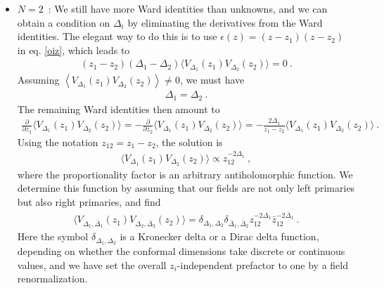 \documentclass[12pt, a4paper, notitlepage, twoside]{report}
\numberwithin{equation}{section}
\theoremstyle{break}
\begin{document}
\begin{itemize}
\item $\boxed{N=2}$\ : We still have more Ward identities than unknowns, and we can obtain a condition on $\Delta_i$ by eliminating the derivatives from the Ward identities.
The elegant way to do this is to use $\epsilon(z)=(z-z_1)(z-z_2)$ in eq. \eqref{oiz}, which leads to 
\begin{align}
 (z_1-z_2)(\Delta_1-\Delta_2)\Big\langle V_{\Delta_1}(z_1)V_{\Delta_2}(z_2)\Big\rangle =0\ .
\end{align}
Assuming $\left\langle V_{\Delta_1}(z_1)V_{\Delta_2}(z_2)\right\rangle\neq 0$, we must have 
\begin{align}
 \Delta_1 = \Delta_2 \ . 
\label{ded}
\end{align}
The remaining Ward identities then amount to 
\begin{align}
 \frac{\partial}{\partial z_1}\Big\langle V_{\Delta_1}(z_1)V_{\Delta_2}(z_2)\Big\rangle = - \frac{\partial}{\partial z_2}\Big\langle V_{\Delta_1}(z_1)V_{\Delta_2}(z_2)\Big\rangle = -\frac{2\Delta_1}{z_1-z_2} \Big\langle V_{\Delta_1}(z_1)V_{\Delta_2}(z_2)\Big\rangle\ .
\end{align}
Using the notation $z_{12}=z_1-z_2$, the solution is
\begin{align}
 \Big\langle V_{\Delta_1}(z_1)V_{\Delta_2}(z_2)\Big\rangle \propto z_{12}^{-2\Delta_1}\ ,
 \label{fzz}
\end{align}
where the proportionality factor is an arbitrary antiholomorphic function. We determine this function by assuming that our fields are not only left primaries but also right primaries, and find
\begin{align}
 \boxed{ \Big\langle V_{\Delta_1,\bar{\Delta}_1}(z_1) V_{\Delta_2,\bar{\Delta}_2}(z_2)\Big\rangle = \delta_{\Delta_1,\Delta_2}\delta_{\bar{\Delta}_1,\bar{\Delta}_2} z_{12}^{-2\Delta_1}\bar z_{12}^{-2\bar \Delta_1} }\ .
 \label{eq:2pt}
\end{align}
Here the symbol $\delta_{\Delta_1,\Delta_2}$ is a Kronecker delta or a Dirac delta function, depending on whether the conformal dimensions take discrete or continuous values, and we have set the overall $z_i$-independent prefactor to one by a field renormalization.


\end{itemize}
\end{document}
